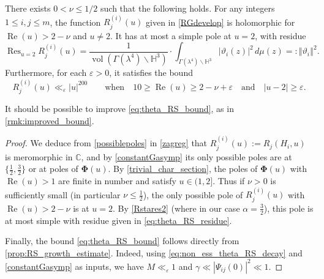 \documentclass[12pt,reqno]{amsart}
\numberwithin{equation}{section}
\renewcommand{\Re}{\operatorname{Re}}
\newcommand\norm[1]{\left\Vert {#1} \right\Vert}
\newcommand{\C}{\mathbb{C}}
\DeclareMathOperator*{\Res}{Res}
\DeclareMathOperator{\vol}{vol}
\begin{document}
\begin{lemma} \label{Gilem}
    There exists $0<\nu \leq 1/2$ such that the following holds. For any integers $1\leq i, j\leq m$, the function $R_{j}^{(i)}(u)$ given in \eqref{RGdevelop} is holomorphic for $\Re(u)>2 - \nu$ and $u \neq 2$. It has at most a simple pole at $u = 2$, with residue
    \begin{equation}\label{eq:theta_RS_residue}
        \Res_{u=2} R_{j}^{(i)}(u) = \frac{1}{\vol(\Gamma(\lambda^4) \backslash \mathbb{H}^3)} \cdot \int_{\Gamma(\lambda^4) \backslash \mathbb{H}^3} |{\vartheta_i(z)}|^2 \, d \mu(z) =: \norm{\vartheta_i}^2.
    \end{equation}
    Furthermore, for each $\varepsilon > 0$, it satisfies the bound
    \begin{equation}\label{eq:theta_RS_bound}
        R_{j}^{(i)}(u) \ll_\varepsilon |u|^{200} \qquad \text{when} \quad 10 \geq \Re(u) \geq 2-\nu + \varepsilon \quad \text{and} \quad |u-2| \geq \varepsilon.
    \end{equation}
\end{lemma}

\begin{remark}
    It should be possible to improve  \eqref{eq:theta_RS_bound}, as in \cref{rmk:improved_bound}.
\end{remark}

\begin{proof} 
    We deduce from \eqref{possiblepoles} in \cref{zagreg} that $R_j^{(i)}(u) := R_{j}(H_{i},u)$ is meromorphic in $\C$, and by \eqref{constantGasymp} its only possible poles are at $\big\{\frac{1}{2}, \frac{3}{2}\big\}$ or at poles of $\boldsymbol{\Phi}(u)$. By \cref{trivial_char_section}, the poles of $\boldsymbol{\Phi}(u)$ with $\Re(u) > 1$ are finite in number and satisfy $u \in (1, 2]$. Thus if $\nu > 0$ is sufficiently small (in particular $\nu \leq \frac{1}{2}$), the only possible pole of $R_j^{(i)}(u)$ with $\Re(u) > 2 - \nu$ is at $u=2$. By \eqref{Rstares2} (where in our case $\alpha = \frac{3}{2}$), this pole is at most simple with residue given in \eqref{eq:theta_RS_residue}. 
    
    Finally, the bound \eqref{eq:theta_RS_bound} follows directly from \cref{prop:RS_growth_estimate}. Indeed, using \eqref{eq:non_ess_theta_RS_decay} and \eqref{constantGasymp} as inputs, we have $M \ll_\varepsilon 1$ and $\gamma \ll |\Psi_{i j}(0)|^2 \ll 1$.
\end{proof}
\end{document}
